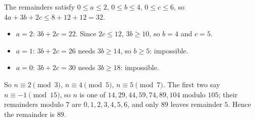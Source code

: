 The remainders satisfy $0\le a\le2$, $0\le b\le4$, $0\le c\le6$, so $4a+3b+2c\le8+12+12=32$.
\begin{itemize}
\item $a=2$: $3b+2c=22$. Since $2c\le12$, $3b\ge10$, so $b=4$ and $c=5$.
\item $a=1$: $3b+2c=26$ needs $3b\ge14$, so $b\ge5$: impossible.
\item $a=0$: $3b+2c=30$ needs $3b\ge18$: impossible.
\end{itemize}
So $n\equiv2\pmod3$, $n\equiv4\pmod5$, $n\equiv5\pmod7$. The first two say $n\equiv-1\pmod{15}$, so $n$ is one of $14,29,44,59,74,89,104$ modulo $105$; their remainders modulo $7$ are $0,1,2,3,4,5,6$, and only $89$ leaves remainder $5$. Hence the remainder is $\boxed{89}$.
